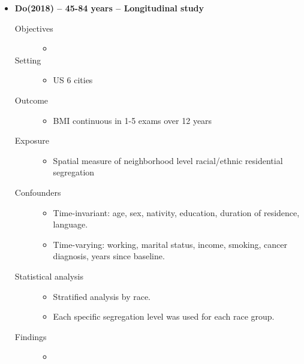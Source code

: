 \documentclass{article}
\begin{document}
\begin{itemize}
\item{\bf Do(2018) -- 45-84 years  -- Longitudinal study}
		\begin{description}
			\item[Objectives]\mbox{}\par
				\begin{itemize} 
					\item 
				\end{itemize} 
			\item[Setting] \mbox{}\par
				\begin{itemize} 
					\item US 6 cities
				\end{itemize} 
			\item[Outcome] \mbox{}\par
				\begin{itemize} 
					\item BMI continuous in 1-5 exams over 12 years
				\end{itemize} 
			\item[Exposure] \mbox{}\par
				\begin{itemize} 
					\item Spatial measure of neighborhood level racial/ethnic residential segregation
				\end{itemize} 
			\item[Confounders] \mbox{}\par
				\begin{itemize} 
					\item Time-invariant: age, sex, nativity, education, duration of residence, language. 
					\item Time-varying: working, marital status, income, smoking, cancer diagnosis, years since baseline.
				\end{itemize} 
			\item[Statistical analysis]\mbox{}\par
				\begin{itemize} 
					\item Stratified analysis by race. 
					\item Each specific segregation level was used for each race group.
				\end{itemize} 
			\item[Findings]\mbox{}\par
				\begin{itemize}
					\item 

\end{itemize}
\end{description}
\end{itemize}
\end{document}
